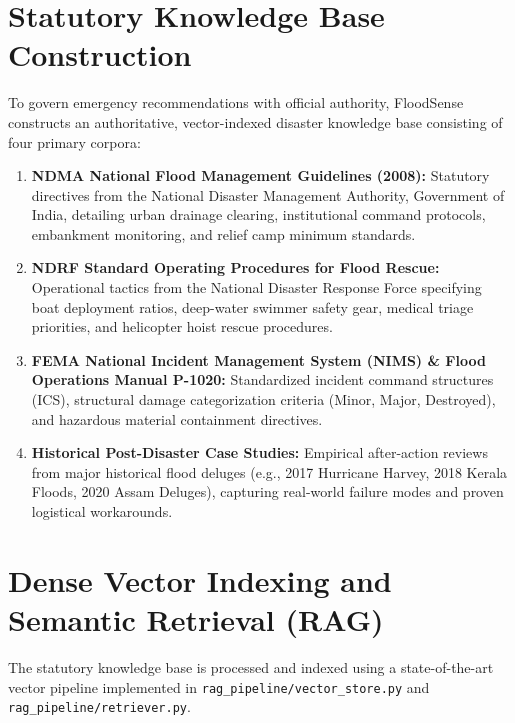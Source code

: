 \section{Statutory Knowledge Base Construction}
To govern emergency recommendations with official authority, FloodSense constructs an authoritative, vector-indexed disaster knowledge base consisting of four primary corpora:
\begin{enumerate}
    \item \textbf{NDMA National Flood Management Guidelines (2008):} Statutory directives from the National Disaster Management Authority, Government of India, detailing urban drainage clearing, institutional command protocols, embankment monitoring, and relief camp minimum standards.
    \item \textbf{NDRF Standard Operating Procedures for Flood Rescue:} Operational tactics from the National Disaster Response Force specifying boat deployment ratios, deep-water swimmer safety gear, medical triage priorities, and helicopter hoist rescue procedures.
    \item \textbf{FEMA National Incident Management System (NIMS) \& Flood Operations Manual P-1020:} Standardized incident command structures (ICS), structural damage categorization criteria (Minor, Major, Destroyed), and hazardous material containment directives.
    \item \textbf{Historical Post-Disaster Case Studies:} Empirical after-action reviews from major historical flood deluges (e.g., 2017 Hurricane Harvey, 2018 Kerala Floods, 2020 Assam Deluges), capturing real-world failure modes and proven logistical workarounds.
\end{enumerate}

\section{Dense Vector Indexing and Semantic Retrieval (RAG)}
The statutory knowledge base is processed and indexed using a state-of-the-art vector pipeline implemented in \texttt{rag\_pipeline/vector\_store.py} and \texttt{rag\_pipeline/retriever.py}.

